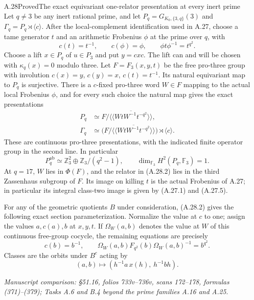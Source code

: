 \begin{statement}{A.28}{Proved}{The exact equivariant one-relator presentation at every inert prime}
Let $q\ne3$ be any inert rational prime, and
let $P_q=G_{K_0,\{3,q\}}(3)$ and
$\Gamma_q=P_q\rtimes\langle c\rangle$.
After the local-complement identification used
in A.27, choose a tame generator $t$ and an
arithmetic Frobenius $\phi$ at the prime over
$q$, with
\[
 c(t)=t^{-1},\qquad c(\phi)=\phi,
 \qquad \phi t\phi^{-1}=t^{q^2}.
 \tag{A.28.1}
\]
Choose a lift $x\in P_q$ of $u\in P_3$ and
put $y=cxc$. The lift can and will be chosen
with $\kappa_q(x)=0$ modulo three. Let
$F=F_3(x,y,t)$ be the free pro-three group
with involution $c(x)=y$, $c(y)=x$,
$c(t)=t^{-1}$. Its natural equivariant
map to $P_q$ is surjective. There is a
$c$-fixed pro-three word $W\in F$ mapping
to the actual local Frobenius $\phi$,
and for every such choice the natural map
gives the exact presentations
\[
 \begin{split}
 P_q&\simeq
 F/\overline{\langle\!\langle
          WtW^{-1}t^{-q^2}\rangle\!\rangle},\\
 \Gamma_q&\simeq
 \bigl(F/\overline{\langle\!\langle
          WtW^{-1}t^{-q^2}\rangle\!\rangle}\bigr)
                         \rtimes\langle c\rangle.
 \end{split}
 \tag{A.28.2}
\]
These are continuous pro-three presentations,
with the indicated finite operator group in
the second line. In particular
\[
 P_q^{\mathrm{ab}}\simeq
 \mathbb Z_3^2\oplus\mathbb Z_3/(q^2-1),
 \qquad
 \dim_{\mathbb F_3}H^2(P_q,\mathbb F_3)=1.
 \tag{A.28.3}
\]
At $q=17$, $W$ lies in $\Phi(F)$, and the
relator in (A.28.2) lies in the third
Zassenhaus subgroup of $F$. Its image on
killing $t$ is the actual Frobenius of A.27;
in particular its integral class-two image
is given by (A.27.1) and (A.27.5).

For any of the geometric quotients $B$ under
consideration, (A.28.2) gives the following
exact section parameterization. Normalize
the value at $c$ to one; assign the values
$a,c(a),b$ at $x,y,t$. If
$\Omega_W(a,b)$ denotes the value at $W$
of this continuous free-group cocycle,
the remaining equations are precisely
\[
 c(b)=b^{-1},\qquad
 \Omega_W(a,b)F_{q^2}(b)\Omega_W(a,b)^{-1}
                                      =b^{q^2}.
 \tag{A.28.4}
\]
Classes are the orbits under $B^c$ acting by
\[
 (a,b)\longmapsto
       (h^{-1}a\,x(h),\ h^{-1}bh).
 \tag{A.28.5}
\]
\par\smallskip\noindent\emph{Manuscript comparison: \S51.16,
folios 733v--736v, scans 172--178, formulas (371)--(379);
Tasks A.6 and B.4 beyond the prime families A.16 and A.25.}
\end{statement}
